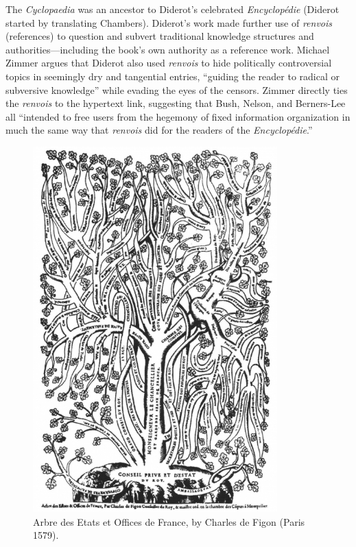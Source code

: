 The \emph{Cyclopaedia} was an ancestor to Diderot's celebrated \emph{Encyclop\'{e}die} (Diderot started by translating Chambers). Diderot's work made further use of \emph{renvois} (references) to question and subvert traditional knowledge structures and authorities---including the book's own authority as a reference work. Michael Zimmer argues that Diderot also used \emph{renvois} to hide politically controversial topics in seemingly dry and tangential entries, ``guiding the reader to radical or subversive knowledge'' while evading the eyes of the censors.\autocite[103]{zimmer_renvois_2009} Zimmer directly ties the \emph{renvois} to the hypertext link, suggesting that Bush, Nelson, and Berners-Lee all ``intended to free users from the hegemony of fixed information organization in much the same way that \emph{renvois} did for the readers of the \emph{Encyclop\'{e}die}.''\autocite[104]{zimmer_renvois_2009}

\begin{figure}[ht]
\centering
\includegraphics[height=400pt]{figures/historictree}
\caption{Arbre des Etats et Offices de France, by Charles de Figon (Paris 1579).}
\label{fig:historictree}
\end{figure}

